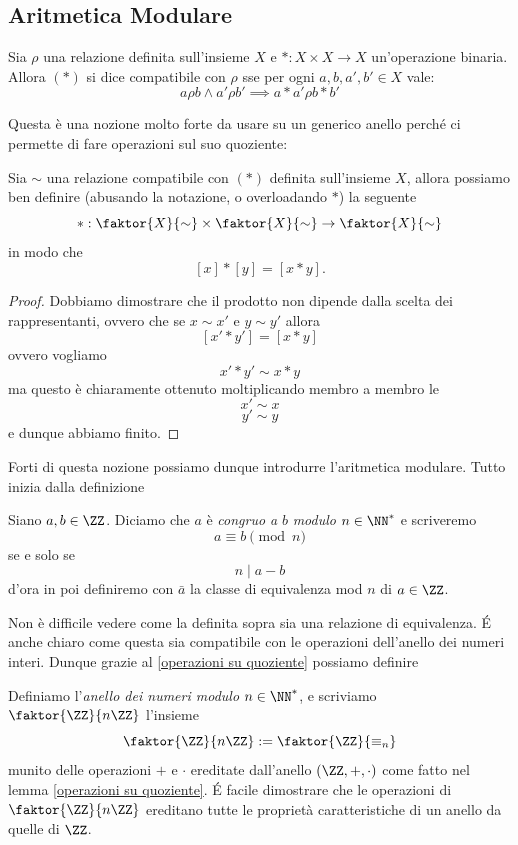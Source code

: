 \documentclass[11pt]{scrartcl}
\begin{document}
	\subsection{Aritmetica Modulare}
	\begin{definition}
		Sia $\rho$ una relazione definita sull'insieme $X$ e $*:X\times X\to X$ un'operazione binaria. Allora $(*)$ si dice compatibile con $\rho$ sse per ogni $a,b,a',b'\in X$ vale:
		$$a\rho b \land a'\rho b'\implies a*a'\rho b*b'$$
	\end{definition}
	Questa è una nozione molto forte da usare su un generico anello perché ci permette di fare operazioni sul suo quoziente:
	\begin{lemma}\label{operazioni su quoziente}
		Sia $\sim$ una relazione compatibile con $(*)$ definita sull'insieme $X$, allora possiamo ben definire (abusando la notazione, o overloadando $*$) la seguente
		$$*:\faktor{X}{\sim}\times \faktor{X}{\sim}\to \faktor{X}{\sim}$$
		in modo che 
		$$[x]*[y]= [x*y].$$
	\end{lemma}
	\begin{proof}
		Dobbiamo dimostrare che il prodotto non dipende dalla scelta dei rappresentanti, ovvero che se $x\sim x'$ e $y\sim y'$ allora
		$$[x'*y']=[x*y]$$
		ovvero vogliamo
		$$x'*y'\sim x*y$$
		ma questo è chiaramente ottenuto moltiplicando membro a membro le
		$$x'\sim x$$
		$$y'\sim y$$
		e dunque abbiamo finito.
	\end{proof}
	Forti di questa nozione possiamo dunque introdurre l'aritmetica modulare. Tutto inizia dalla definizione
	\begin{definition}
		Siano $a,b\in\ZZ$. Diciamo che $a$ è \textit{congruo a} $b$ \textit{modulo} $n\in\NN^*$ e scriveremo 
		$$a\equiv b \pmod n$$
		se e solo se 
		$$n\mid a-b$$
		d'ora in poi definiremo con $\bar{a}$ la classe di equivalenza mod $n$ di $a\in\ZZ$.
	\end{definition}
	Non è difficile vedere come la definita sopra sia una relazione di equivalenza. \'E anche chiaro come questa sia compatibile con le operazioni dell'anello dei numeri interi. Dunque grazie al \ref{operazioni su quoziente} possiamo definire 
	\begin{definition}
		Definiamo l'\textit{anello dei numeri modulo} $n\in\NN^*$, e scriviamo $\faktor{\ZZ}{n\ZZ}$ l'insieme
		$$\faktor{\ZZ}{n\ZZ}:=\faktor{\ZZ}{\equiv_n}$$
		munito delle operazioni $+$ e $\cdot$ ereditate dall'anello $(\ZZ,+,\cdot)$ come fatto nel lemma \ref{operazioni su quoziente}. \'E facile dimostrare che le operazioni di $\faktor{\ZZ}{n\ZZ}$ ereditano tutte le proprietà caratteristiche di un anello da quelle di $\ZZ$.
	\end{definition}
\end{document}
